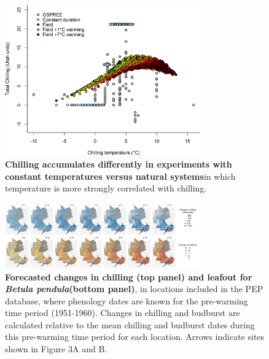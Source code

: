 \documentclass{article}
\begin{document}
\begin{figure}[h!]
\centering
\noindent \includegraphics[width=0.75\textwidth]{..//..//analyses/bb_analysis/figures/exp_vs_field_chill_withwarmingcols.png}
\caption{\textbf{Chilling accumulates differently in experiments with constant temperatures versus natural systems}in which temperature is more strongly correlated with chilling.}
\label{fig:chillexpfield}
\end{figure}

\begin{figure}[h!]
\centering
\noindent \includegraphics[width=0.75\textwidth]{..//..//analyses/bb_analysis/figures/forecasting/heatmapsbetpepfinalarrows.png}
\caption{\textbf{Forecasted changes in chilling (top panel) and leafout for \emph{Betula pendula}(bottom panel)}, in locations included in the PEP database, where phenology dates are known for the pre-warming time period (1951-1960). Changes in chilling and budburst are calculated relative to the mean chilling and budburst dates during this pre-warming time period for each location. Arrows indicate sites shown in Figure 3A and B.} 
\label{fig:foremap}
\end{figure}
\end{document}
